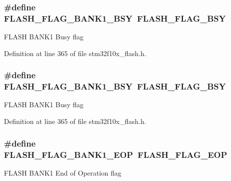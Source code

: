 \subsubsection[{\texorpdfstring{F\+L\+A\+S\+H\+\_\+\+F\+L\+A\+G\+\_\+\+B\+A\+N\+K1\+\_\+\+B\+SY}{FLASH_FLAG_BANK1_BSY}}]{\setlength{\rightskip}{0pt plus 5cm}\#define F\+L\+A\+S\+H\+\_\+\+F\+L\+A\+G\+\_\+\+B\+A\+N\+K1\+\_\+\+B\+SY~{\bf F\+L\+A\+S\+H\+\_\+\+F\+L\+A\+G\+\_\+\+B\+SY}}\hypertarget{group___f_l_a_s_h___flags_ga1f85e6d511503886e9fbe7d0228c97a4}{}\label{group___f_l_a_s_h___flags_ga1f85e6d511503886e9fbe7d0228c97a4}
F\+L\+A\+SH B\+A\+N\+K1 Busy flag 

Definition at line 365 of file stm32f10x\+\_\+flash.\+h.

\subsubsection[{\texorpdfstring{F\+L\+A\+S\+H\+\_\+\+F\+L\+A\+G\+\_\+\+B\+A\+N\+K1\+\_\+\+B\+SY}{FLASH_FLAG_BANK1_BSY}}]{\setlength{\rightskip}{0pt plus 5cm}\#define F\+L\+A\+S\+H\+\_\+\+F\+L\+A\+G\+\_\+\+B\+A\+N\+K1\+\_\+\+B\+SY~{\bf F\+L\+A\+S\+H\+\_\+\+F\+L\+A\+G\+\_\+\+B\+SY}}\hypertarget{group___f_l_a_s_h___flags_ga1f85e6d511503886e9fbe7d0228c97a4}{}\label{group___f_l_a_s_h___flags_ga1f85e6d511503886e9fbe7d0228c97a4}
F\+L\+A\+SH B\+A\+N\+K1 Busy flag 

Definition at line 365 of file stm32f10x\+\_\+flash.\+h.

\subsubsection[{\texorpdfstring{F\+L\+A\+S\+H\+\_\+\+F\+L\+A\+G\+\_\+\+B\+A\+N\+K1\+\_\+\+E\+OP}{FLASH_FLAG_BANK1_EOP}}]{\setlength{\rightskip}{0pt plus 5cm}\#define F\+L\+A\+S\+H\+\_\+\+F\+L\+A\+G\+\_\+\+B\+A\+N\+K1\+\_\+\+E\+OP~{\bf F\+L\+A\+S\+H\+\_\+\+F\+L\+A\+G\+\_\+\+E\+OP}}\hypertarget{group___f_l_a_s_h___flags_gafa7670ee5ce8a2eb1f64c458a9f08e5b}{}\label{group___f_l_a_s_h___flags_gafa7670ee5ce8a2eb1f64c458a9f08e5b}
F\+L\+A\+SH B\+A\+N\+K1 End of Operation flag 

